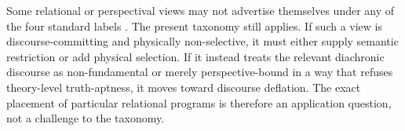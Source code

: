 \begin{remark}
Some relational or perspectival views may not advertise themselves under any of the four standard
labels \citep{rovelli1996}. The present taxonomy still applies. If such a view is discourse-committing and
physically non-selective, it must either supply semantic restriction or add physical selection. If it
instead treats the relevant diachronic discourse as non-fundamental or merely perspective-bound in a
way that refuses theory-level truth-aptness, it moves toward discourse deflation. The exact placement
of particular relational programs is therefore an application question, not a challenge to the taxonomy.
\end{remark}
